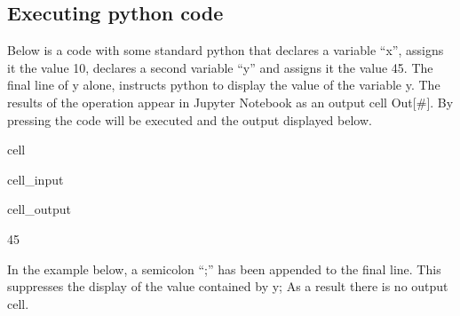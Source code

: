 \documentclass[letterpaper,10pt,english]{jupyterBook}
\begin{document}
\subsection{Executing python code}
\label{\detokenize{content/04_PythonEssentials/Intro_Jupyter_notebook:executing-python-code}}
\sphinxAtStartPar
Below is a code with some standard python that declares a variable “x”, assigns it the value 10, declares a second variable “y” and assigns it the value 45.  The final line of y alone, instructs python to display the value of the variable y.  The results of the operation appear in Jupyter Notebook as an output cell Out{[}\#{]}.  By pressing  the code will be executed and the output displayed below.

\begin{sphinxuseclass}{cell}\begin{sphinxVerbatimInput}

\begin{sphinxuseclass}{cell_input}
\begin{sphinxVerbatim}[commandchars=\\\{\}]
  
  
\end{sphinxVerbatim}

\end{sphinxuseclass}\end{sphinxVerbatimInput}
\begin{sphinxVerbatimOutput}

\begin{sphinxuseclass}{cell_output}
\begin{sphinxVerbatim}[commandchars=\\\{\}]
45
\end{sphinxVerbatim}

\end{sphinxuseclass}\end{sphinxVerbatimOutput}

\end{sphinxuseclass}
\sphinxAtStartPar
{}

\sphinxAtStartPar
In the example below, a semi\sphinxhyphen{}colon “;” has been appended to the final line.  This suppresses the display of the value contained by y;  As a result there is no output cell.
\end{document}

